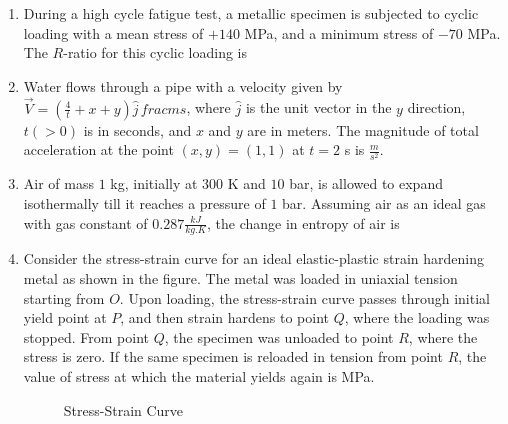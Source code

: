 \documentclass{article}
\newcommand{\brak}[1]{\left( #1 \right)}
\newcommand{\gt}{>}
\begin{document}
\begin{enumerate}
\item During a high cycle fatigue test, a metallic specimen is subjected to cyclic loading with a mean stress of $+140$ MPa, and a minimum stress of $-70$ MPa. The $R$-ratio  for this cyclic loading is 
    
\item Water flows through a pipe with a velocity given by $\vec{V} = \brak{ \frac{4}{t} + x + y } \hat{j} \, frac{m}{s}$, where $\hat{j}$ is the unit vector in the $y$ direction, $t \brak{ \gt 0 }$ is in seconds, and $x$ and $y$ are in meters. The magnitude of total acceleration at the point $\brak{ x, y } = \brak{ 1, 1 }$ at $t = 2$ s is  $\frac{m}{s^2}$.
    
\item Air of mass $1$ kg, initially at $300$ K and $10$ bar, is allowed to expand isothermally till it reaches a pressure of $1$ bar. Assuming air as an ideal gas with gas constant of $0.287 \frac{kJ}{kg.K}$, the change in entropy of air is 

\item Consider the stress-strain curve for an ideal elastic-plastic strain hardening metal as shown in the figure. The metal was loaded in uniaxial tension starting from $O$. Upon loading, the stress-strain curve passes through initial yield point at $P$, and then strain hardens to point $Q$, where the loading was stopped. From point $Q$, the specimen was unloaded to point $R$, where the stress is zero. If the same specimen is reloaded in tension from point $R$, the value of stress at which the material yields again is MPa.

\begin{figure}[!ht]
\centering
{}
\caption{Stress-Strain Curve}
\end{figure}


\end{enumerate}
\end{document}
